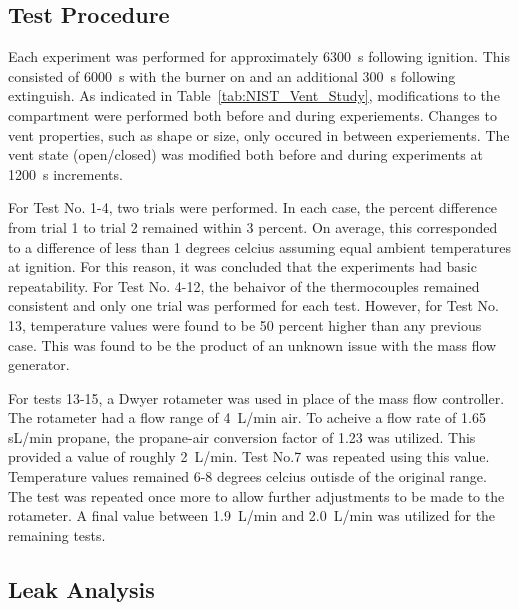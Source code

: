 \subsection{Test Procedure}
Each experiment was performed for approximately 6300~s following ignition. This consisted of 6000~s with the burner on and an additional 300~s following extinguish. As indicated in Table~\ref{tab:NIST_Vent_Study}, modifications to the compartment were performed both before and during experiements. Changes to vent properties, such as shape or size, only occured in between experiements. The vent state (open/closed) was modified both before and during experiments at 1200~s increments. 

For Test No. 1-4, two trials were performed. In each case, the percent difference from trial 1 to trial 2 remained within 3 percent. On average, this  corresponded to a difference of less than 1 degrees celcius assuming equal ambient temperatures at ignition. For this reason, it was concluded that the experiments had basic repeatability. For Test No. 4-12, the behaivor of the thermocouples remained consistent and only one trial was performed for each test. However, for Test No. 13, temperature values were found to be 50 percent higher than any previous case. This was found to be the product of an unknown issue with the mass flow generator.

For tests 13-15, a Dwyer rotameter was used in place of the mass flow controller. The rotameter had a flow range of 4~L/min air. To acheive a flow rate of 1.65 sL/min propane, the propane-air conversion factor of 1.23 was utilized. This provided a value of roughly  2~L/min. Test No.7 was repeated using this value. Temperature values remained 6-8 degrees celcius outisde of the original range. The test was repeated once more to allow further adjustments to be made to the rotameter. A final value between 1.9~L/min and 2.0~L/min was utilized for the remaining tests.

\subsection{Leak Analysis}


